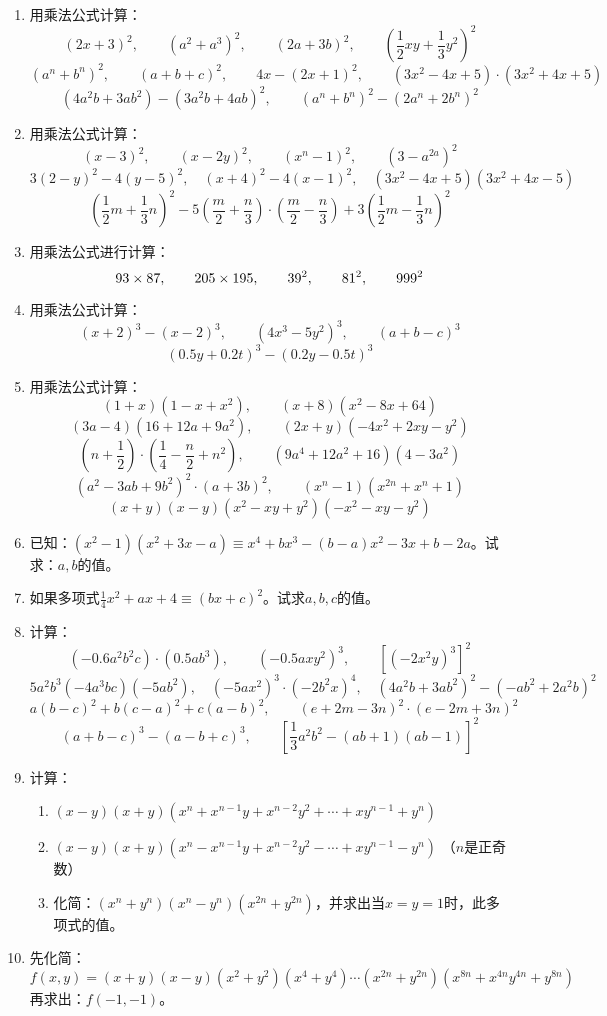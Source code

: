 \begin{enumerate}
\item 用乘法公式计算：
\[(2x+3)^2,\qquad  (a^2+a^3)^2,\qquad  (2a+3b)^2,\qquad  \left(\frac{1}{2}xy+\frac{1}{3}y^2\right)^2\]
\[(a^n+b^n)^2,\qquad  (a+b+c)^2,\qquad  4x- (2x+1)^2,\qquad  (3x^2-4x+5) \cdot  (3x^2+4x+5) \]
\[(4a^2b+3ab^2) - (3a^2b+4ab)^ 2,\qquad (a^n+b^n)^2-(2a^n+2b^n)^2\]

\item 用乘法公式计算：
\[(x-3)^2,\qquad (x-2y)^2,\qquad (x^n-1)^2,\qquad \left(3-a^{2a}\right)^2 \]
\[3(2-y)^2-4(y-5)^2,\quad (x+4)^2-4(x-1)^2,\quad (3x^2-4x+5)(3x^2+4x-5) \]
\[\left(\frac{1}{2}m+\frac{1}{3}n\right)^2 -5\left(\frac{m}{2}+\frac{n}{3}\right)\cdot \left(\frac{m}{2}-\frac{n}{3}\right)+3\left(\frac{1}{2}m-\frac{1}{3}n\right)^2  \]

\item 用乘法公式进行计算：
\[93\times 87,\qquad 205\times 195,\qquad 39^2,\qquad 81^2,\qquad 999^2 \]

\item 用乘法公式计算：
\[(x+2)^3-(x-2)^3,\qquad (4x^3-5y^2)^3,\qquad (a+b-c)^3  \]
\[ (0.5y+0.2t)^3-(0.2y-0.5t)^3 \]

\item 用乘法公式计算：
\[(1+x)(1-x+x^2),\qquad (x+8)(x^2-8x+64) \]
\[(3a-4)(16+12a+9a^2),\qquad (2x+y)(-4x^2+2xy-y^2)\]
\[\left(n+\frac{1}{2}\right)\cdot \left(\frac{1}{4}-\frac{n}{2}+n^2\right),\qquad (9a^4+12a^2+16)(4-3a^2)\]
\[(a^2-3ab+9b^2)^2\cdot (a+3b)^2,\qquad (x^n-1)(x^{2n}+x^n+1)\]
\[(x+y)(x-y)(x^2-xy+y^2)(-x^2-xy-y^2)\]

\item 已知：$(x^2-1)(x^2+3x-a)\equiv x^4+bx^3-(b-a)x^2-3x+b-2a$。试求：$a,b$的值。
\item  如果多项式$\frac{1}{4}x^2+ax+4\equiv (bx+c)^2$。试求$a,b,c$的值。
\item 计算：
\[(-0.6a^2b^2c)\cdot (0.5ab^3),\qquad (-0.5axy^2)^3,\qquad [(-2x^2y)^3]^2\]
\[5a^2b^3 (-4a^3bc)(-5ab^2),\quad (-5ax^2)^3\cdot (-2b^2x)^4,\quad (4a^2b+3ab^2)^2-(-ab^2+2a^2b)^2\]
\[a(b-c)^2+b(c-a)^2+c(a-b)^2,\qquad (e+2m-3n)^2\cdot (e-2m+3n)^2\]
\[(a+b-c)^3-(a-b+c)^3,\qquad \left[\frac{1}{3}a^2b^2-(ab+1)(ab-1)\right]^2\]
\item 计算：
\begin{enumerate}
    \item $(x-y)(x+y)(x^n+x^{n-1}y+x^{n-2}y^2+\cdots +xy^{n-1}+y^n)$
    \item $(x-y)(x+y)(x^n-x^{n-1}y+x^{n-2}y^2-\cdots +xy^{n-1}-y^n)$ （$n$是正奇数）
    \item 化简：$(x^n+y^n)(x^n-y^n)(x^{2n}+y^{2n})$，并求出当$x=y=1$时，此多项式的值。
\end{enumerate}

\item 先化简：
\[f(x,y)=(x+y)(x-y)(x^2+y^2)(x^4+y^4)\cdots (x^{2n}+y^{2n})\left(x^{8n}+x^{4n}y^{4n}+y^{8n}\right)  \]
再求出：$f(-1,-1)$。
\end{enumerate}

